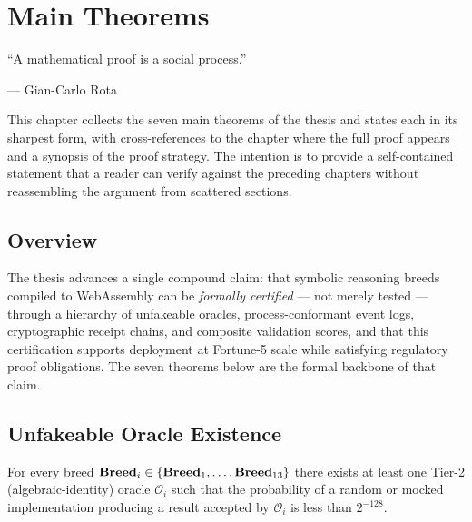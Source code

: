
\chapter{Main Theorems}
\label{chap:main-theorems}

\epigraph{%
  ``A mathematical proof is a social process.''
}{--- Gian-Carlo Rota}

\noindent This chapter collects the seven main theorems of the thesis and states each in
its sharpest form, with cross-references to the chapter where the full proof appears and
a synopsis of the proof strategy. The intention is to provide a self-contained statement
that a reader can verify against the preceding chapters without reassembling the argument
from scattered sections.

\section{Overview}
\label{sec:main-theorems-overview}

The thesis advances a single compound claim: that symbolic reasoning breeds compiled to
WebAssembly can be \emph{formally certified} — not merely tested — through a hierarchy of
unfakeable oracles, process-conformant event logs, cryptographic receipt chains, and
composite validation scores, and that this certification supports deployment at Fortune-5
scale while satisfying regulatory proof obligations. The seven theorems below are the
formal backbone of that claim.

\section{Unfakeable Oracle Existence}
\label{sec:thm-oracle}

\begin{theorem}
\label{thm:main-oracle}
For every breed $\mathbf{Breed}_i \in \{\mathbf{Breed}_1, \ldots, \mathbf{Breed}_{13}\}$ there exists at least
one Tier-2 (algebraic-identity) oracle $\mathcal{O}_i$ such that the probability of a
random or mocked implementation producing a result accepted by $\mathcal{O}_i$ is less
than $2^{-128}$.
\end{theorem}

